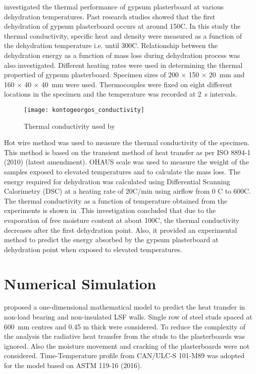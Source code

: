 \citet{Kontogeorgos2011} investigated the thermal performance of gypsum plasterboard at various dehydration temperatures. Past research studies showed that the first dehydration of gypsum plasterboard occurs at around 150\degree C. In this study the thermal conductivity, specific heat and density were measured as a function of the dehydration temperature i.e. until 300\degree C. Relationship between the dehydration energy as a function of mass loss during dehydration process was also investigated. Different heating rates were used in determining the thermal propertied of gypsum plasterboard. Specimen sizes of 200 $\times$ 150 $\times$ 20~mm and 160 $\times$ 40 $\times$ 40~mm were used. Thermocouples were fixed on eight different locations in the specimen and the temperature was recorded at 2~s intervals. 
\begin{figure}[htbp]
	\centering
		\texttt{[image: kontogeorgos\_conductivity]}		
		\caption{Thermal conductivity used by \citet{Kontogeorgos2011}}
		\label{fig:kontogeorgos_conductivity}
\end{figure}

Hot wire method was used to measure the thermal conductivity of the specimen. This method is based on the transient method of heat transfer as per ISO 8894-1 (2010) (latest amendment). OHAUS scale was used to measure the weight of the samples exposed to elevated temperatures and to calculate the mass loss. The energy required for dehydration was calculated using Differential Scanning Calorimetry (DSC) at a heating rate of 20\degree C/min using airflow from 0 \degree C to 600\degree C. The thermal conductivity as a function of temperature obtained from the experiments is shown in .This investigation concluded that due to the evaporation of free moisture content at about 100\degree C, the thermal conductivity decreases after the first dehydration point. Also, it provided an experimental method to predict the energy absorbed by the gypsum plasterboard at dehydration point when exposed to elevated temperatures.

\section{Numerical Simulation}

\citet{Sultan1996} proposed a one-dimensional mathematical model to predict the heat transfer in non-load bearing and non-insulated LSF walls. Single row of steel studs spaced at 600~mm centres and 0.45 m thick were considered. To reduce the complexity of the analysis the radiative heat transfer from the studs to the plasterboards was ignored. Also the moisture movement and cracking of the plasterboards were not considered. Time-Temperature profile from CAN/ULC-S 101-M89 was adopted for the model based on ASTM 119-16 (2016).

